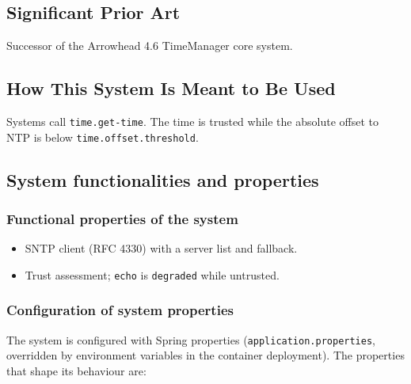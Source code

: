 \documentclass[a4paper]{arrowhead}
\begin{document}
\newpage

\subsection{Significant Prior Art}
\label{sec:prior_art}

Successor of the Arrowhead 4.6 TimeManager core system.

\subsection{How This System Is Meant to Be Used}
\label{sec:use}

Systems call \texttt{time.\allowbreak{}get-\allowbreak{}time}. The time is trusted while the absolute offset to NTP is below \texttt{time.\allowbreak{}offset.\allowbreak{}threshold}.

\subsection{System functionalities and properties}
\label{sec:properties}

\subsubsection{Functional properties of the system}

\begin{itemize}
  \item SNTP client (RFC 4330) with a server list and fallback.
  \item Trust assessment; \texttt{echo} is \texttt{degraded} while untrusted.
\end{itemize}

\subsubsection{Configuration of system properties}

The system is configured with Spring properties (\texttt{application.properties}, overridden by environment variables in the container deployment). The properties that shape its behaviour are:
\end{document}
